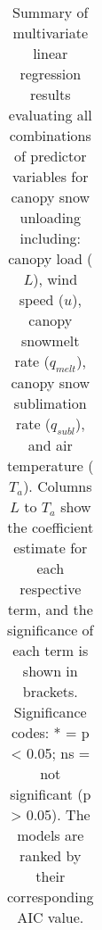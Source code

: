 \documentclass[
]{agujournal2019}
\begin{document}
\begin{longtable}[]{@{}
  >{\raggedright\arraybackslash}p{}
  >{\raggedright\arraybackslash}p{}
  >{\raggedright\arraybackslash}p{}
  >{\raggedright\arraybackslash}p{}
  >{\raggedright\arraybackslash}p{}
  >{\raggedright\arraybackslash}p{}
  >{\raggedright\arraybackslash}p{}
  >{\raggedright\arraybackslash}p{}
  >{\raggedleft\arraybackslash}p{}
  >{\raggedleft\arraybackslash}p{}@{}}

\caption{\label{tbl-q-unld-bins}Summary of multivariate linear
regression results evaluating all combinations of predictor variables
for canopy snow unloading including: canopy load (\(L\)), wind speed
(\(u\)), canopy snowmelt rate (\(q_{melt}\)), canopy snow sublimation
rate (\(q_{subl}\)), and air temperature (\(T_a\)). Columns \(L\) to
\(T_a\) show the coefficient estimate for each respective term, and the
significance of each term is shown in brackets. Significance codes: * =
p \textless{} 0.05; ns = not significant (p \textgreater{} 0.05). The
models are ranked by their corresponding AIC value.}

\tabularnewline


\end{longtable}
\end{document}
